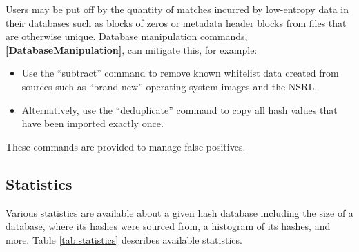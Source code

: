 \documentclass[11pt,fleqn]{article} %
\begin{document}
Users may be put off by the quantity of matches incurred by low-entropy data in their databases such as blocks of zeros or metadata header blocks from files that are otherwise unique. Database manipulation commands,
\textbf{\autoref{DatabaseManipulation}}, can mitigate this, for example:
\begin{itemize}
\item Use the ``subtract'' command to remove known whitelist data created from sources such as ``brand new'' operating system images and the NSRL.
\item Alternatively, use the ``deduplicate'' command to copy all hash values that have been imported exactly once.
\end{itemize}
These commands are provided to manage false positives.

\subsection{Statistics}
Various statistics are available about a given hash database including the size of a database, where its hashes were sourced from, a histogram of its hashes, and more.
Table \ref{tab:statistics} describes available statistics.\\
\end{document}
